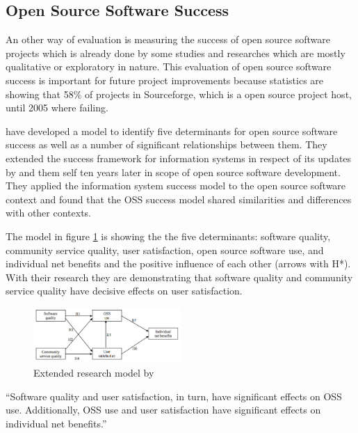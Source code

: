 \documentclass[DIV=calc,paper=a4,fontsize=9pt,twocolumn]{scrartcl}
\begin{document}
\subsection{Open Source Software Success} \label{sec:oss-success}

An other way of evaluation is measuring the success of open source software projects which is already done by some studies and researches which are mostly qualitative or exploratory in nature. This evaluation of open source software success is important for future project improvements because statistics are showing that 58\% of projects in Sourceforge, which is a open source project host, until 2005 where failing. \citep{lee2009measuring}

\citet{lee2009measuring} have developed a model to identify five determinants for open source software success as well as a number of significant relationships between them. They extended the \citet{delone1992information} success framework for information systems in respect of its updates by \citet{seddon1997respecification} and them self ten years later in scope of open source software development. They applied the information system success model to the open source software context and found that the OSS success model shared similarities and differences with other contexts. \citep{lee2009measuring}

The model in figure \ref{fig:success-model} is showing the the five determinants: software quality, community service quality, user satisfaction, open source software use, and individual net benefits and the positive influence of each other (arrows with H*). With their research they are demonstrating that software quality and community service quality have decisive effects on user satisfaction. \citep{lee2009measuring}

\begin{figure}[ht]
    \includegraphics[width=0.5\textwidth ]{img/success-model.png}{}
    \centering
    \caption{Extended research model by \citet{lee2009measuring}}\label{fig:success-model}
\end{figure}

\enquote{Software quality and user satisfaction, in turn, have significant effects on OSS use. Additionally, OSS use and user satisfaction have significant effects on individual net benefits.} \citep{lee2009measuring}
\end{document}

